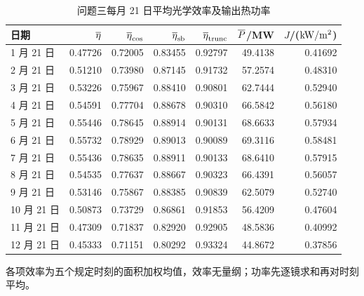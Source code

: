 \begin{table}[H]
\centering\small
\caption{问题三每月 21 日平均光学效率及输出热功率}\label{tab:q3month}
\begin{tabular}{lrrrrrr}
\toprule
日期 & $\overline{\eta}$ & $\overline{\eta}_{\rm cos}$ & $\overline{\eta}_{\rm sb}$ & $\overline{\eta}_{\rm trunc}$ & $\overline{P}$/MW & $J$/($\mathrm{kW}/\mathrm{m}^{2}$)\\\midrule
1 月 21 日 & 0.47726 & 0.72005 & 0.83455 & 0.92797 & 49.4138 & 0.41692\\
2 月 21 日 & 0.51210 & 0.73980 & 0.87145 & 0.91732 & 57.2574 & 0.48310\\
3 月 21 日 & 0.53226 & 0.75967 & 0.88410 & 0.90801 & 62.7444 & 0.52940\\
4 月 21 日 & 0.54591 & 0.77704 & 0.88678 & 0.90310 & 66.5842 & 0.56180\\
5 月 21 日 & 0.55446 & 0.78645 & 0.88914 & 0.90131 & 68.6633 & 0.57934\\
6 月 21 日 & 0.55732 & 0.78929 & 0.89013 & 0.90089 & 69.3116 & 0.58481\\
7 月 21 日 & 0.55436 & 0.78635 & 0.88911 & 0.90133 & 68.6410 & 0.57915\\
8 月 21 日 & 0.54535 & 0.77637 & 0.88667 & 0.90323 & 66.4391 & 0.56057\\
9 月 21 日 & 0.53146 & 0.75867 & 0.88385 & 0.90839 & 62.5079 & 0.52740\\
10 月 21 日 & 0.50873 & 0.73729 & 0.86861 & 0.91853 & 56.4209 & 0.47604\\
11 月 21 日 & 0.47309 & 0.71837 & 0.82920 & 0.92905 & 48.5836 & 0.40992\\
12 月 21 日 & 0.45333 & 0.71151 & 0.80292 & 0.93324 & 44.8672 & 0.37856\\
\bottomrule
\end{tabular}
\par\vspace{3pt}\begin{minipage}{.95\linewidth}\footnotesize 各项效率为五个规定时刻的面积加权均值，效率无量纲；功率先逐镜求和再对时刻平均。\end{minipage}
\end{table}
